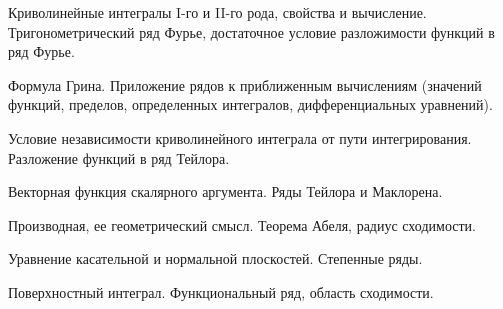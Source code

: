 \documentclass[
	14pt,
	a4paper,
	]
	{scrartcl}
\begin{document}
\vfill

\newpage


\shapk
{}
\setcounter{zad}{0}

\vfill
\z Криволинейные интегралы I-го и II-го рода, свойства и вычисление.
 \vfill
\z Тригонометрический ряд Фурье, достаточное условие разложимости функций в ряд Фурье.
 \vfill

\vfill

\newpage


\shapk
{}
\setcounter{zad}{0}

\vfill
\z Формула Грина.
 \vfill
\z Приложение рядов к приближенным вычислениям (значений функций, пределов, определенных интегралов, дифференциальных уравнений).
 \vfill

\vfill

\newpage


\shapk
{}
\setcounter{zad}{0}

\vfill
\z Условие независимости криволинейного интеграла от пути интегрирования.
 \vfill
\z Разложение функций в ряд Тейлора.
 \vfill

\vfill

\newpage


\shapk
{}
\setcounter{zad}{0}

\vfill
\z Векторная функция скалярного аргумента.
 \vfill
\z Ряды Тейлора и Маклорена.
 \vfill

\vfill

\newpage


\shapk
{}
\setcounter{zad}{0}

\vfill
\z Производная, ее геометрический смысл.
 \vfill
\z Теорема Абеля, радиус сходимости.
 \vfill

\vfill

\newpage


\shapk
{}
\setcounter{zad}{0}

\vfill
\z Уравнение касательной и нормальной плоскостей.
 \vfill
\z Степенные ряды.
 \vfill

\vfill

\newpage


\shapk
{}
\setcounter{zad}{0}

\vfill
\z Поверхностный интеграл.
 \vfill
\z Функциональный ряд, область сходимости.
 \vfill

\vfill

\newpage
\end{document}
